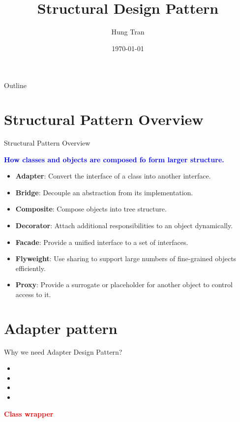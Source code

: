 \documentclass[13pt]{beamer}
\title[Design Pattern]{Structural Design Pattern}
\author{Hung Tran}
\institute{Fpt software}
\date{\today}
\begin{document}
\begin{frame}
\titlepage
\end{frame}

\begin{frame}{Outline}
\tableofcontents
\end{frame}

\section{Structural Pattern Overview}

\begin{frame}{Structural Pattern Overview}
	\begin{center}
	\textcolor{blue}{\textbf{How classes and objects are composed fo form larger structure.}}
	\end{center}
	\begin{itemize}
		\item \textbf{Adapter}: Convert the interface of a class into another interface.
		\item \textbf{Bridge}: Decouple an abstraction from its implementation.
		\item \textbf{Composite}: Compose objects into tree structure.
		\item \textbf{Decorator}: Attach additional responsibilities to an object dynamically.
		\item \textbf{Facade}: Provide a unified interface to a set of interfaces.
		\item \textbf{Flyweight}: Use sharing to support large numbers of fine-grained objects efficiently.
		\item \textbf{Proxy}: Provide a surrogate or placeholder for another object to control access to it.
	\end{itemize}
\end{frame}

\section{Adapter pattern}

\begin{frame}{Why we need Adapter Design Pattern?}
	\begin{itemize}
		\setlength\itemsep{1em}
		\item 
		\item 
		\item 
		\item 
	\end{itemize}
	\begin{center}
	\textcolor{red}{\textbf{Class wrapper}}
	\end{center}
\end{frame}
\end{document}
